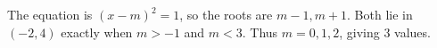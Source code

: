The equation is $(x-m)^2=1$, so the roots are $m-1,m+1$. Both lie in $(-2,4)$ exactly when $m>-1$ and $m<3$. Thus $m=0,1,2$, giving $\boxed3$ values.
